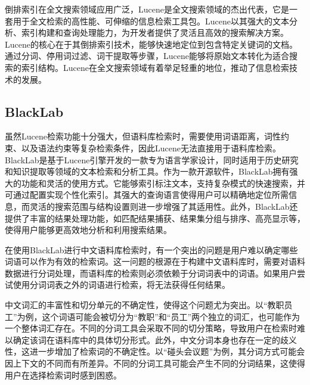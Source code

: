 \documentclass[11pt]{article}
\begin{document}
\begin{CJK*}{UTF8}{gbsn}
倒排索引在全文搜索领域应用广泛，Lucene是全文搜索领域的杰出代表，它是一套用于全文检索的高性能、可伸缩的信息检索工具包。Lucene以其强大的文本分析、索引构建和查询处理能力，为开发者提供了灵活且高效的搜索解决方案。Lucene的核心在于其倒排索引技术，能够快速地定位到包含特定关键词的文档。通过分词、停用词过滤、词干提取等步骤，Lucene能够将原始文本转化为适合搜索的索引结构。Lucene在全文搜索领域有着举足轻重的地位，推动了信息检索技术的发展。

\subsection{BlackLab}

虽然Lucene检索功能十分强大，但语料库检索时，需要使用词语距离，词性约束、以及语法约束等复杂检索条件，因此Lucene无法直接用于语料库检索。BlackLab是基于Lucene引擎开发的一款专为语言学家设计，同时适用于历史研究和知识提取等领域的文本检索和分析工具。作为一款开源软件，BlackLab拥有强大的功能和灵活的使用方式。它能够索引标注文本，支持复杂模式的快速搜索，并可通过配置实现个性化索引。其强大的查询语言使得用户可以精确地定位所需信息，而灵活的搜索范围与结构设置则进一步增强了其适用性。此外，BlackLab还提供了丰富的结果处理功能，如匹配结果捕获、结果集分组与排序、高亮显示等，使得用户能够更高效地分析和利用搜索结果。


在使用BlackLab进行中文语料库检索时，有一个突出的问题是用户难以确定哪些词语可以作为有效的检索词。这一问题的根源在于构建中文语料库时，需要对语料数据进行分词处理，而语料库的检索则必须依赖于分词词表中的词语。如果用户尝试使用分词词表之外的词语进行检索，将无法获得任何结果。

中文词汇的丰富性和切分单元的不确定性，使得这个问题尤为突出。以“教职员工”为例，这个词语可能会被切分为“教职”和“员工”两个独立的词汇，也可能作为一个整体词汇存在。不同的分词工具会采取不同的切分策略，导致用户在检索时难以确定该词在语料库中的具体切分形式。此外，中文分词本身也存在一定的歧义性，这进一步增加了检索词的不确定性。以“碰头会议题”为例，其分词方式可能会因上下文的不同而有所差异。不同的分词工具可能会产生不同的分词结果，这使得用户在选择检索词时感到困惑。


\end{CJK*}
\end{document}
